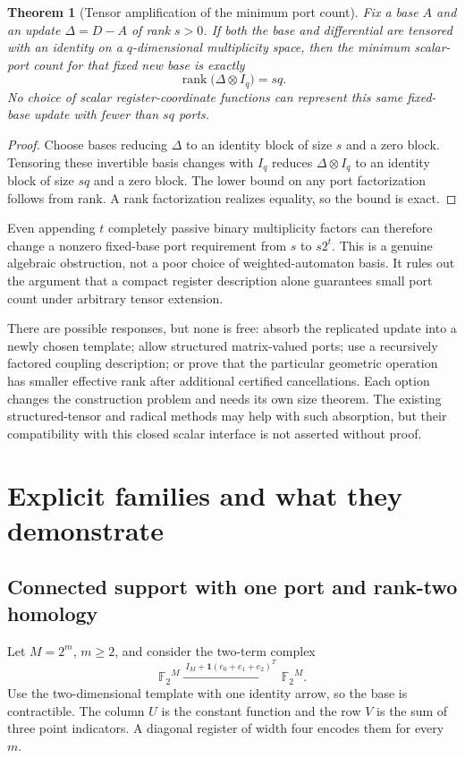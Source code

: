 \documentclass[11pt,letterpaper]{article}
\newcommand{\F}{{\mathbb F_2}}
\newcommand{\rk}{\operatorname{rank}}
\newcommand{\one}{\mathbf 1}
\newtheorem{theorem}{Theorem}[section]
\theoremstyle{definition}
\theoremstyle{remark}
\numberwithin{equation}{section}
\begin{document}
\begin{theorem}[Tensor amplification of the minimum port count]
\label{thm:tensor}
Fix a base $A$ and an update $\Delta=D-A$ of rank $s>0$. If both the base
and differential are tensored with an identity on a $q$-dimensional
multiplicity space, then the minimum scalar-port count for that fixed
new base is exactly
\begin{equation}
 \rk\bigl(\Delta\otimes I_q\bigr)=sq.
 \label{eq:amplification}
\end{equation}
No choice of scalar register-coordinate functions can represent this
same fixed-base update with fewer than $sq$ ports.
\end{theorem}
\begin{proof}
Choose bases reducing $\Delta$ to an identity block of size $s$ and a
zero block. Tensoring these invertible basis changes with $I_q$ reduces
$\Delta\otimes I_q$ to an identity block of size $sq$ and a zero block.
The lower bound on any port factorization follows from rank. A rank
factorization realizes equality, so the bound is exact.
\end{proof}

Even appending $t$ completely passive binary multiplicity factors can
therefore change a nonzero fixed-base port requirement from $s$ to
$s2^t$. This is a genuine algebraic obstruction, not a poor choice of
weighted-automaton basis. It rules out the argument that a compact
register description alone guarantees small port count under arbitrary
tensor extension.

There are possible responses, but none is free: absorb the replicated
update into a newly chosen template; allow structured matrix-valued ports;
use a recursively factored coupling description; or prove that the
particular geometric operation has smaller effective rank after additional
certified cancellations. Each option changes the construction problem and
needs its own size theorem. The existing structured-tensor and radical
methods may help with such absorption, but their compatibility with this
closed scalar interface is not asserted without proof.

\section{Explicit families and what they demonstrate}
\label{sec:examples}

\subsection{Connected support with one port and rank-two homology}
Let $M=2^m$, $m\ge2$, and consider the two-term complex
\begin{equation}
 \F^M\xrightarrow{\ I_M+\one(e_0+e_1+e_2)^T\ }\F^M.
 \label{eq:connected}
\end{equation}
Use the two-dimensional template with one identity arrow, so the base
is contractible. The column $U$ is the constant function and the row $V$
is the sum of three point indicators. A diagonal register of width four
encodes them for every $m$.
\end{document}
